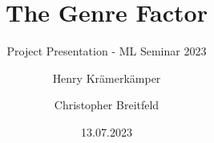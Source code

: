 \documentclass[8pt]{beamer}
\title{The Genre Factor}
\subtitle{Project Presentation - ML Seminar 2023}
\author{Henry Krämerkämper\\%
  \and%
  Christopher Breitfeld}
\institute{Technische Universität Dortmund}
\date{13.07.2023}
\begin{document}
\begin{frame}
  \titlepage
\end{frame}








\printbibliography

\appendix
\end{document}
